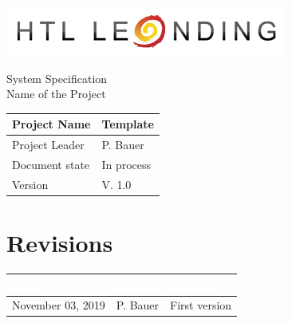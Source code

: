 \documentclass[12pt]{article}
\theoremstyle{definition}
\newcommand{\projectname}{Template}
\newcommand{\productname}{Name of the Project}
\newcommand{\projectleader}{P. Bauer}
\newcommand{\documentstatus}{In process}
\newcommand{\version}{V. 1.0}
\begin{document}
\begin{titlepage}
\begin{flushright}
\includegraphics[scale=.5]{htlleondinglogo.png}\\
\end{flushright}

\vspace{10em}

\begin{center}
{\Huge System Specification} \\[3em]
{\LARGE \productname} \\[3em]
\end{center}

\begin{flushleft}
\begin{tabular}{|l|l|}
\hline
Project Name & \projectname \\ \hline
Project Leader & \projectleader \\ \hline
Document state & \documentstatus \\ \hline
Version & \version \\ \hline
\end{tabular}
\end{flushleft}

\end{titlepage}
\section*{Revisions}
\begin{tabular}{|l|l|l|}
\hline
\cellcolor[gray]{0.5}\textcolor{white}{Date} & \cellcolor[gray]{0.5}\textcolor{white}{Author} & \cellcolor[gray]{0.5}\textcolor{white}{Change} \\ \hline
November 03, 2019&P. Bauer&First version \\ \hline
\end{tabular}
\pagebreak

\tableofcontents
\pagebreak
\end{document}
